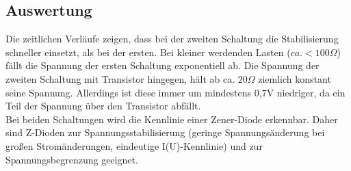 \documentclass{article}
\begin{document}
\subsection{Auswertung}
Die zeitlichen Verläufe zeigen, dass bei der zweiten Schaltung die Stabilisierung schneller einsetzt, als bei der ersten. Bei kleiner werdenden Lasten ($ca. <100\Omega$) fällt die Spannung der ersten Schaltung exponentiell ab.
Die Spannung der zweiten Schaltung mit Transistor hingegen, hält ab ca. $20\Omega$ ziemlich konstant seine Spannung.
Allerdings ist diese immer um mindestens 0,7V niedriger, da ein Teil der Spannung über den Transistor abfällt.\\
Bei beiden Schaltungen wird die Kennlinie einer Zener-Diode erkennbar. Daher sind Z-Dioden zur Spannungsstabilisierung (geringe Spannungsänderung bei großen Stromänderungen, eindeutige I(U)-Kennlinie) und zur Spannungsbegrenzung geeignet.
\end{document}
